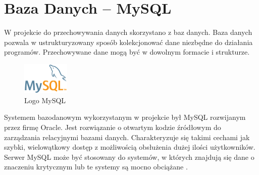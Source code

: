 \documentclass[eng,printmode,oneside]{mgr}
\begin{document}
\newpage
\section{Baza Danych -- MySQL}

W projekcie do przechowywania danych skorzystano z baz danych. Baza danych
pozwala w ustrukturyzowany sposób kolekcjonować dane niezbędne do działania
programów. Przechowywane dane mogą być w dowolnym formacie i strukturze.

\begin{figure}
\centering
\includegraphics[width=0.2\textwidth]{logomysql.png}
\caption{Logo MySQL \cite{Mysql.com}}
\label{fig:mysql}
\end{figure}

Systemem bazodanowym wykorzystanym w projekcie był MySQL rozwijanym przez
firmę Oracle. Jest rozwiązanie o otwartym kodzie źródłowym do zarządzania
relacyjnymi bazami danych.
Charakteryzuje się takimi cechami jak szybki, wielowątkowy dostęp z możliwością obsłużenia dużej ilości użytkowników. Serwer
MySQL może być stosowany do systemów, w których znajdują się dane o znaczeniu
krytycznym lub te systemy są mocno obciążane \cite{Mysql.com}. 
\end{document}
